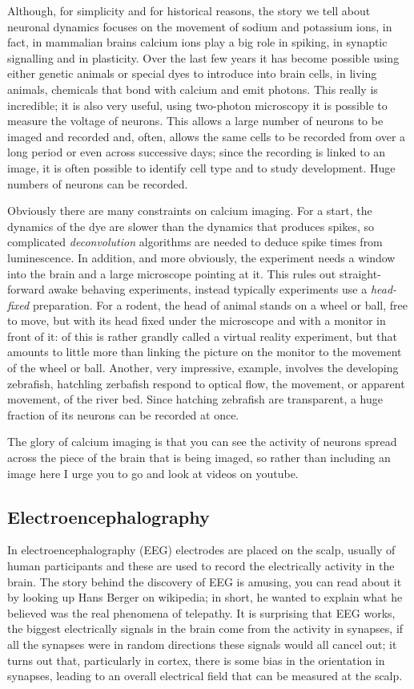 \documentclass[12pt]{article}
\begin{document}
Although, for simplicity and for historical reasons, the story we tell
about neuronal dynamics focuses on the movement of sodium and
potassium ions, in fact, in mammalian brains calcium ions play a big
role in spiking, in synaptic signalling and in plasticity. Over the
last few years it has become possible using either genetic animals or
special dyes to introduce into brain cells, in living animals,
chemicals that bond with calcium and emit photons. This really is
incredible; it is also very useful, using two-photon microscopy it is
possible to measure the voltage of neurons. This allows a large number
of neurons to be imaged and recorded and, often, allows the same cells
to be recorded from over a long period or even across successive days;
since the recording is linked to an image, it is often possible to
identify cell type and to study development. Huge numbers of neurons
can be recorded.

Obviously there are many constraints on calcium imaging. For a start,
the dynamics of the dye are slower than the dynamics that produces
spikes, so complicated \textsl{deconvolution} algorithms are needed to
deduce spike times from luminescence. In addition, and more obviously,
the experiment needs a window into the brain and a large microscope
pointing at it. This rules out straight-forward awake behaving
experiments, instead typically experiments use a \textsl{head-fixed}
preparation. For a rodent, the head of animal stands on a wheel or
ball, free to move, but with its head fixed under the microscope and
with a monitor in front of it: of this is rather grandly called a
virtual reality experiment, but that amounts to little more than
linking the picture on the monitor to the movement of the wheel or
ball. Another, very impressive, example, involves the developing
zebrafish, hatchling zerbafish respond to optical flow, the movement,
or apparent movement, of the river bed. Since hatching zebrafish are
transparent, a huge fraction of its neurons can be recorded at once.

The glory of calcium imaging is that you can see the activity of
neurons spread across the piece of the brain that is being imaged, so
rather than including an image here I urge you to go and look at
videos on youtube.

\subsection*{Electroencephalography}

In electroencephalography (EEG) electrodes are placed on the scalp,
usually of human participants and these are used to record the
electrically activity in the brain. The story behind the discovery of
EEG is amusing, you can read about it by looking up Hans Berger on
wikipedia; in short, he wanted to explain what he believed was the
real phenomena of telepathy. It is surprising that EEG works, the
biggest electrically signals in the brain come from the activity in
synapses, if all the synapses were in random directions these signals
would all cancel out; it turns out that, particularly in cortex, there
is some bias in the orientation in synapses, leading to an overall
electrical field that can be measured at the scalp.
\end{document}
